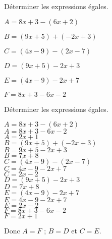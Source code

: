 \begin{exercice*}
    Déterminer les expressions égales.
    \begin{multicols}{2}
        \begin{itemize}
            \begin{spacing}{1.1}
                \item[] $A= 8x+3-(6x+2)$
                \item[] $B= (9x+5)+(-2x+3)$
                \item[] $C= (4x-9)-(2x-7)$
                \item[] $D= (9x+5)-2x+3$
                \item[] $E= (4x-9)-2x+7$
                \item[] $F= 8x+3-6x-2$
            \end{spacing}
        \end{itemize}
    \end{multicols}
\end{exercice*}
\begin{corrige}
    Déterminer les expressions égales.
    \begin{multicols}{2}
        \begin{itemize}
            \begin{spacing}{1.2}
                \def\item{}
                \item $A= 8x+3-(6x+2)$\\
                {\red $A = 8x+3-6x-2$\\$A=2x+1$}\\
                \item $B= (9x+5)+(-2x+3)$\\
                {\red $B= 9x+5-2x+3$\\$B=7x+8$}\\
                \item $C= (4x-9)-(2x-7)$\\
                {\red $C=4x-9-2x+7$\\$C=2x-2$}\\
                \columnbreak
                \item $D= (9x+5)-2x+3$\\
                {\red $D=7x+8$}\\
                \item $E= (4x-9)-2x+7$\\
                {\red $E=4x-9-2x+7$\\$E=2x-2$}\\
                \item $F= 8x+3-6x-2$\\
                {\red $F=2x+1$}
            \end{spacing}
        \end{itemize}
    \end{multicols}
    {\red Donc $A=F$ ; $B=D$ et $C=E$.}
\end{corrige}

